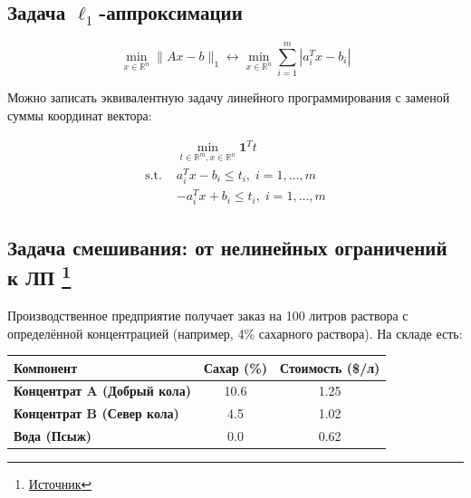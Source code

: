 \documentclass[
  russian,
  letterpaper,
  DIV=11,
  numbers=noendperiod]{scrartcl}
\begin{document}
\subsection{\texorpdfstring{Задача
\(\ell_1\)-аппроксимации}{Задача \textbackslash ell\_1-аппроксимации}}\label{ux437ux430ux434ux430ux447ux430-ell_1-ux430ux43fux43fux440ux43eux43aux441ux438ux43cux430ux446ux438ux438}

\[
\min_{x \in \mathbb{R}^n} \|Ax - b\|_1 \leftrightarrow \min_{x \in \mathbb{R}^n} \sum_{i=1}^m |a_i^T x - b_i|
\]

Можно записать эквивалентную задачу линейного программирования с заменой
суммы координат вектора:

\[
\begin{split}
&\min_{t \in \mathbb{R}^m, x \in \mathbb{R}^n} \mathbf{1}^T t \\
\text{s.t. } & a_i^T x - b_i \leq t_i, \; i = 1,\dots, m\\
& -a_i^T x + b_i \leq t_i, \; i = 1,\dots, m
\end{split}
\]

\subsection[Задача смешивания: от нелинейных ограничений к ЛП
]{\texorpdfstring{Задача смешивания: от нелинейных ограничений к ЛП
\footnote{\href{https://jckantor.github.io/ND-Pyomo-Cookbook/notebooks/02.03-Linear-Blending-Problem.html}{Источник}}}{Задача смешивания: от нелинейных ограничений к ЛП }}\label{ux437ux430ux434ux430ux447ux430-ux441ux43cux435ux448ux438ux432ux430ux43dux438ux44f-ux43eux442-ux43dux435ux43bux438ux43dux435ux439ux43dux44bux445-ux43eux433ux440ux430ux43dux438ux447ux435ux43dux438ux439-ux43a-ux43bux43f}

Производственное предприятие получает заказ на 100 литров раствора с
определённой концентрацией (например, 4\% сахарного раствора). На складе
есть:

\begin{longtable}[]{@{}lcc@{}}
\toprule\noalign{}
Компонент & Сахар (\%) & Стоимость (\$/л) \\
\midrule\noalign{}
\endhead
\bottomrule\noalign{}
\endlastfoot
\textbf{Концентрат A (Добрый кола)} & 10.6 & 1.25 \\
\textbf{Концентрат B (Север кола)} & 4.5 & 1.02 \\
\textbf{Вода (Псыж)} & 0.0 & 0.62 \\
\end{longtable}
\end{document}
